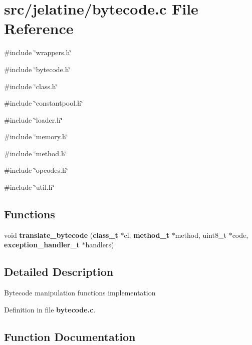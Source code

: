 \section{src/jelatine/bytecode.c File Reference}
\label{bytecode_8c}
{\ttfamily \#include \char`\"{}wrappers.h\char`\"{}}\par
{\ttfamily \#include \char`\"{}bytecode.h\char`\"{}}\par
{\ttfamily \#include \char`\"{}class.h\char`\"{}}\par
{\ttfamily \#include \char`\"{}constantpool.h\char`\"{}}\par
{\ttfamily \#include \char`\"{}loader.h\char`\"{}}\par
{\ttfamily \#include \char`\"{}memory.h\char`\"{}}\par
{\ttfamily \#include \char`\"{}method.h\char`\"{}}\par
{\ttfamily \#include \char`\"{}opcodes.h\char`\"{}}\par
{\ttfamily \#include \char`\"{}util.h\char`\"{}}\par
\subsection*{Functions}
\begin{DoxyCompactItemize}
\item 
void {\bf translate\_\-bytecode} ({\bf class\_\-t} $\ast$cl, {\bf method\_\-t} $\ast$method, uint8\_\-t $\ast$code, {\bf exception\_\-handler\_\-t} $\ast$handlers)
\end{DoxyCompactItemize}


\subsection{Detailed Description}
Bytecode manipulation functions implementation 

Definition in file {\bf bytecode.c}.



\subsection{Function Documentation}
